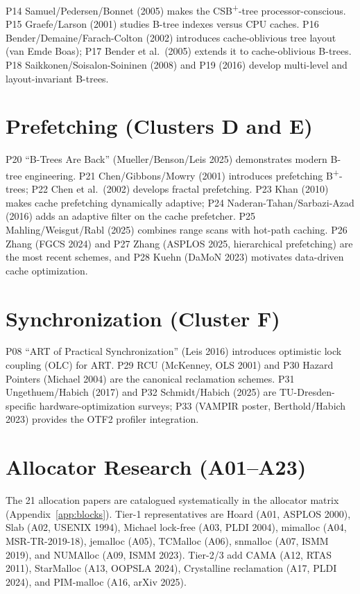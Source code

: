 P14 Samuel/Pedersen/Bonnet (2005) makes the CSB\textsuperscript{+}-tree
processor-conscious. P15 Graefe/Larson (2001) studies B-tree indexes versus CPU caches.
P16 Bender/Demaine/Farach-Colton (2002) introduces cache-oblivious tree layout (van Emde
Boas); P17 Bender et al.\ (2005) extends it to cache-oblivious B-trees. P18
Saikkonen/Soisalon-Soininen (2008) and P19 (2016) develop multi-level and
layout-invariant B-trees.

\section{Prefetching (Clusters D and E)}\label{sec:cluster-de}

P20 ``B-Trees Are Back'' (Mueller/Benson/Leis 2025) demonstrates modern B-tree
engineering. P21 Chen/Gibbons/Mowry (2001) introduces prefetching B\textsuperscript{+}-trees;
P22 Chen et al.\ (2002) develops fractal prefetching. P23 Khan (2010) makes cache
prefetching dynamically adaptive; P24 Naderan-Tahan/Sarbazi-Azad (2016) adds an adaptive
filter on the cache prefetcher. P25 Mahling/Weisgut/Rabl (2025) combines range scans with
hot-path caching. P26 Zhang (FGCS 2024) and P27 Zhang (ASPLOS 2025, hierarchical
prefetching) are the most recent schemes, and P28 Kuehn (DaMoN 2023) motivates
data-driven cache optimization.

\section{Synchronization (Cluster F)}\label{sec:cluster-f}

P08 ``ART of Practical Synchronization'' (Leis 2016) introduces optimistic lock coupling
(OLC) for ART. P29 RCU (McKenney, OLS 2001) and P30 Hazard Pointers (Michael 2004) are the
canonical reclamation schemes. P31 Ungethuem/Habich (2017) and P32 Schmidt/Habich (2025)
are TU-Dresden-specific hardware-optimization surveys; P33 (VAMPIR poster,
Berthold/Habich 2023) provides the OTF2 profiler integration.

\section{Allocator Research (A01--A23)}\label{sec:allocators}

The 21 allocation papers are catalogued systematically in the allocator matrix
(Appendix~\ref{app:blocks}). Tier-1 representatives are Hoard (A01, ASPLOS 2000), Slab
(A02, USENIX 1994), Michael lock-free (A03, PLDI 2004), mimalloc (A04, MSR-TR-2019-18),
jemalloc (A05), TCMalloc (A06), snmalloc (A07, ISMM 2019), and NUMAlloc (A09, ISMM 2023).
Tier-2/3 add CAMA (A12, RTAS 2011), StarMalloc (A13, OOPSLA 2024), Crystalline reclamation
(A17, PLDI 2024), and PIM-malloc (A16, arXiv 2025).

